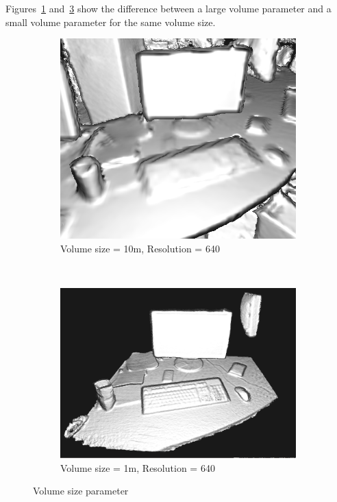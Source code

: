 \documentclass[12pt, twoside]{article}
\begin{document}
Figures~\ref{fig:largevol} and~\ref{fig:smallvol} show the difference between a large volume parameter and a small volume parameter for the same volume size.

\begin{figure}[h]
        \centering
        \begin{subfigure}[t]{0.45\textwidth}
                \includegraphics[width=1\textwidth]{VolLarge.png}
                \caption{Volume size = 10m, Resolution = 640}
                \label{fig:largevol}
        \end{subfigure}~
        \begin{subfigure}[t]{0.45\textwidth}
                \includegraphics[width=1\textwidth]{VolSmall.png}
                \caption{Volume size = 1m, Resolution = 640}
                \label{fig:smallvol}
        \end{subfigure}
        \caption{Volume size parameter}
        
\end{figure}
\end{document}
